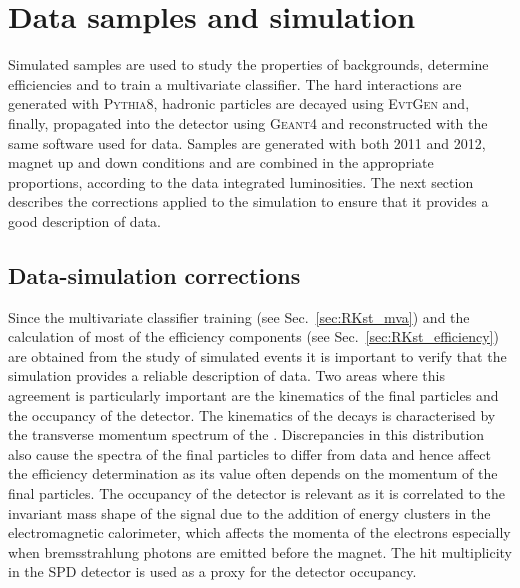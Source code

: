 \section{Data samples and simulation}

Simulated samples are used to study the properties of backgrounds, determine efficiencies and to train
a multivariate classifier. The hard interactions are generated with \textsc{Pythia8}, hadronic particles
are decayed using \textsc{EvtGen} and, finally, propagated into the detector using \textsc{Geant4} and reconstructed
with the same software used for data. Samples are generated with both 2011 and 2012, magnet up and down
conditions and are combined in the appropriate proportions, according to the data integrated luminosities.
The next section describes the corrections applied to the simulation to ensure that it provides a good description of data.


\subsection{Data-simulation corrections}
\label{sec:RKst_mc_weighting}

Since the multivariate classifier training (see Sec.~\ref{sec:RKst_mva}) and the calculation
of most of the efficiency components (see Sec.~\ref{sec:RKst_efficiency}) are obtained from
the study of simulated events it is important to verify that the simulation provides a reliable 
description of data. Two areas where this agreement is particularly important are 
the kinematics of the final particles and the occupancy of the detector.
The kinematics of the decays is characterised by the transverse momentum spectrum of
the \Bz. Discrepancies in this distribution also cause the spectra of the final particles
to differ from data and hence affect the efficiency determination as its value often
depends on the momentum of the final particles.
The occupancy of the detector is relevant as it is correlated to the invariant mass shape of the signal
due to the addition of energy clusters in the electromagnetic calorimeter,
which affects the momenta of the electrons especially when bremsstrahlung photons are emitted before the magnet.
The hit multiplicity in the SPD detector is used as a proxy for the detector occupancy.

